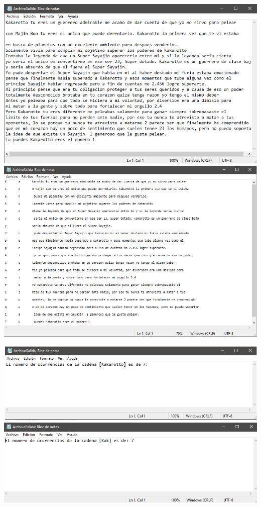 \documentclass[12pt,letterpaper]{report}
\begin{document}
\begin{multicols}{2}
\includegraphics[scale=0.35]{ArchivoSalida3}
\includegraphics[scale=0.35]{ArchivoSalida4}
\end{multicols}


\begin{multicols}{2}
\includegraphics[scale=0.35]{ArchivoSalida5}\\
\includegraphics[scale=0.35]{ArchivoSalida6}
\end{multicols}
\end{document}
